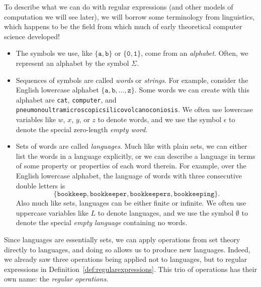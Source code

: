 To describe what we can do with regular expressions (and other models of computation we will see later), we will borrow some terminology from linguistics, which happens to be the field from which much of early theoretical computer science developed!
\begin{colouredbox}
\begin{itemize}
\item The symbols we use, like $\{\texttt{a}, \texttt{b}\}$ or $\{\texttt{0}, \texttt{1}\}$, come from an \emph{alphabet}. Often, we represent an alphabet by the symbol $\Sigma$.
\item Sequences of symbols are called \emph{words} or \emph{strings}. For example, consider the English lowercase alphabet $\{\texttt{a}, \texttt{b}, \dots, \texttt{z}\}$. Some words we can create with this alphabet are \texttt{cat}, \texttt{computer}, and \texttt{pneumonoultramicroscopicsilicovolcanoconiosis}. We often use lowercase variables like $w$, $x$, $y$, or $z$ to denote words, and we use the symbol $\epsilon$ to denote the special zero-length \emph{empty word}.
\item Sets of words are called \emph{languages}. Much like with plain sets, we can either list the words in a language explicitly, or we can describe a language in terms of some property or properties of each word therein. For example, over the English lowercase alphabet, the language of words with three consecutive double letters is
	\begin{equation*}
	\{\texttt{bookkeep}, \texttt{bookkeeper}, \texttt{bookkeepers}, \texttt{bookkeeping}\}.
	\end{equation*}
	Also much like sets, languages can be either finite or infinite. We often use uppercase variables like $L$ to denote languages, and we use the symbol $\emptyset$ to denote the special \emph{empty language} containing no words.
\end{itemize}
\end{colouredbox}

Since languages are essentially sets, we can apply operations from set theory directly to languages, and doing so allows us to produce new languages. Indeed, we already saw three operations being applied not to languages, but to regular expressions in Definition~\ref{def:regularexpressions}. This trio of operations has their own name: the \emph{regular operations}.

